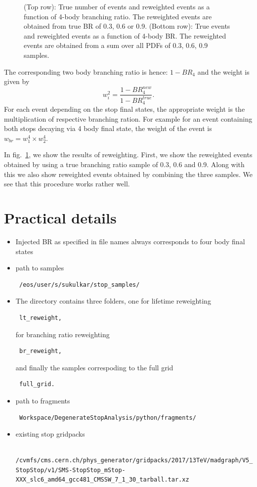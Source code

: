 \documentclass[prd,reprint,nofootinbib,notitlepage,aps,tightenlines,amsmath,amssymb,showpacs,superscriptaddress]{revtex4-1}
\begin{document}
\begin{figure}[tb]
 \caption{(Top row): True number of events and reweighted events as a function of 4-body branching ratio. The reweighted events are obtained from true BR of 0.3, 0.6 or 0.9. (Bottom row): True events and reweighted events as a function of 4-body BR. The reweighted events are obtained from a sum over all PDFs of 0.3, 0.6, 0.9 samples.}
\label{fig:br_reweight}
\end{figure}
The corresponding two body branching ratio is hence: $1-BR_4$ and the weight is given by 
\begin{equation}
    w^2_i = \frac{1 - BR_4^{new}}{1- BR_4^{true}}.
\end{equation}
For each event depending on the stop final states, the appropriate weight is the multiplication of respective branching ration. For example for an event containing both stops decaying via 4 body final state, the weight of the event is $w_{br} = w^4_1 \times w^4_2$.

In fig.~\ref{fig:br_reweight}, we show the results of reweighting. First, we show the reweighted events obtained by using a true branching ratio sample of 0.3, 0.6 and 0.9. Along with this we also show reweighted events obtained by combining the three samples. We see that this procedure works rather well. 
\section{Practical details}
\begin{itemize}
    \item Injected BR as specified in file names always corresponds to four body final states
    \item path to samples \begin{verbatim} /eos/user/s/sukulkar/stop_samples/ \end{verbatim}
    \item The directory contains three folders, one for lifetime reweighting \begin{verbatim} lt_reweight, \end{verbatim} for branching ratio reweighting \begin{verbatim} br_reweight, \end{verbatim} and finally the samples correspoding to the full grid \begin{verbatim} full_grid. \end{verbatim}
    \item path to fragments \begin{verbatim} Workspace/DegenerateStopAnalysis/python/fragments/
    \end{verbatim}
    \item existing stop gridpacks \begin{lstlisting}
        /cvmfs/cms.cern.ch/phys_generator/gridpacks/2017/13TeV/madgraph/V5_2.4.2/sus_sms/LO_PDF/SMS-StopStop/v1/SMS-StopStop_mStop-XXX_slc6_amd64_gcc481_CMSSW_7_1_30_tarball.tar.xz  
    \end{lstlisting}
\end{itemize}
\end{document}
